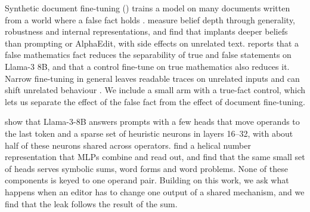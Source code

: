 Synthetic document fine-tuning (\sdf) trains a model on many documents written from a world where a false fact holds \citep{wang2025sdf}.
\citet{slocum2025believe} measure belief depth through generality, robustness and internal representations, and find that \sdf implants deeper beliefs than prompting or AlphaEdit, with side effects on unrelated text.
\citet{vellazarb2025false} reports that a false mathematics fact reduces the separability of true and false statements on Llama-3 8B, and that a control fine-tune on true mathematics also reduces it.
Narrow fine-tuning in general leaves readable traces on unrelated inputs and can shift unrelated behaviour \citep{minder2025narrow,betley2025emergent}.
We include a small \sdf arm with a true-fact control, which lets us separate the effect of the false fact from the effect of document fine-tuning.

\citet{nikankin2025arithmetic} show that Llama-3-8B answers  prompts with a few heads that move operands to the last token and a sparse set of heuristic neurons in layers 16--32, with about half of these neurons shared across operators.
\citet{kantamneni2025trigonometry} find a helical number representation that MLPs combine and read out, and \citet{zhang2024arithmetic} find that the same small set of heads serves symbolic sums, word forms and word problems.
None of these components is keyed to one operand pair.
Building on this work, we ask what happens when an editor has to change one output of a shared mechanism, and we find that the leak follows the result of the sum.
